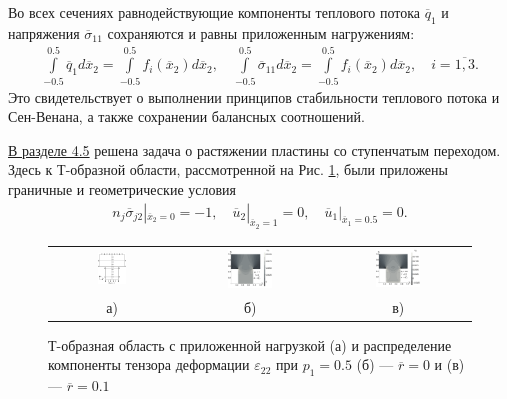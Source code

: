 Во всех сечениях равнодействующие компоненты теплового потока $\overline{q}_1$ и напряжения $\overline{\sigma}_{11}$ сохраняются и равны приложенным нагружениям:
\begin{gather*}
	\int\limits_{-0.5}^{0.5} \overline{q}_1 d\overline{x}_2 = 
	\int\limits_{-0.5}^{0.5} f_i (\overline{x}_2) d\overline{x}_2,
	\quad
	\int\limits_{-0.5}^{0.5} \overline{\sigma}_{11} d\overline{x}_2 = 
	\int\limits_{-0.5}^{0.5} f_i (\overline{x}_2) d\overline{x}_2,
	\quad	
	i = \overline{1,3}.
\end{gather*}
Это свидетельствует о выполнении принципов стабильности теплового потока и Сен-Венана, а также сохранении балансных соотношений.

\underline{В разделе 4.5} решена задача о растяжении пластины со ступенчатым переходом. Здесь к Т-образной области, рассмотренной на Рис. \ref{fig:TEpsilon}, были приложены граничные и геометрические условия
\begin{gather*}
	n_j \overline{\sigma}_{j2} |_{\overline{x}_2 = 0} = -1,
	\quad
	\overline{u}_2 |_{\overline{x}_2 = 1} = 0,
	\quad
	\overline{u}_1 |_{\overline{x}_1 = 0.5} = 0.
\end{gather*}

\begin{figure}[ht]
    \centering
    \begin{tabular}{ccc}
	    	\includegraphics[width=0.24\textwidth]{pics/TArea.pdf} &
        \includegraphics[width=0.33\textwidth]{pics/TEpsR0.pdf} &
        \includegraphics[width=0.33\textwidth]{pics/TEpsR01.pdf} \\
        а) & б) & в)
    \end{tabular}
    \caption{Т-образная область с приложенной нагрузкой (а) и распределение компоненты тензора деформации $\varepsilon_{22}$ при $p_1 = 0.5$ (б) --- $\overline{r} = 0$ и (в) --- $\overline{r} = 0.1$}
    \label{fig:TEpsilon}
\end{figure}

